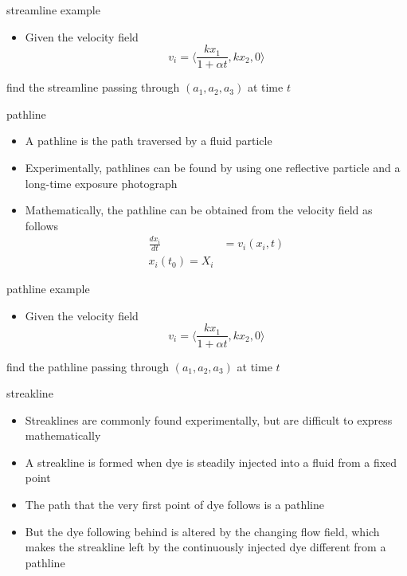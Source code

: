 \documentclass[12pt,handout]{beamer}
\providecommand{\tightlist}{%
  \setlength{\itemsep}{0pt}\setlength{\parskip}{0pt}}
\providecommand{\tightlist}{%
\setlength{\itemsep}{0pt}\setlength{\parskip}{0pt}}
\begin{document}
\begin{frame}{streamline example}
\protect\hypertarget{streamline-example}{}
\begin{itemize}
\tightlist
\item
  Given the velocity field
  \[v_i = \langle \frac{kx_1}{1+\alpha t}, kx_2, 0 \rangle\]
\end{itemize}

find the streamline passing through \((a_1,a_2,a_3)\) at time \(t\)
\end{frame}

\begin{frame}{pathline}
\protect\hypertarget{pathline}{}
\begin{itemize}
\tightlist
\item
  A pathline is the path traversed by a fluid particle
\item
  Experimentally, pathlines can be found by using one reflective
  particle and a long-time exposure photograph
\item
  Mathematically, the pathline can be obtained from the velocity field
  as follows \[\begin{aligned}
    \frac{dx_i}{dt} &= v_i(x_i,t)\\
    x_i(t_0) = X_i
  \end{aligned}\]
\end{itemize}
\end{frame}

\begin{frame}{pathline example}
\protect\hypertarget{pathline-example}{}
\begin{itemize}
\tightlist
\item
  Given the velocity field
  \[v_i = \langle \frac{kx_1}{1+\alpha t}, kx_2, 0 \rangle\]
\end{itemize}

find the pathline passing through \((a_1,a_2,a_3)\) at time \(t\)
\end{frame}

\begin{frame}{streakline}
\protect\hypertarget{streakline}{}
\begin{itemize}
\tightlist
\item
  Streaklines are commonly found experimentally, but are difficult to
  express mathematically
\item
  A streakline is formed when dye is steadily injected into a fluid from
  a fixed point
\item
  The path that the very first point of dye follows is a pathline
\item
  But the dye following behind is altered by the changing flow field,
  which makes the streakline left by the continuously injected dye
  different from a pathline
\end{itemize}
\end{frame}
\end{document}
